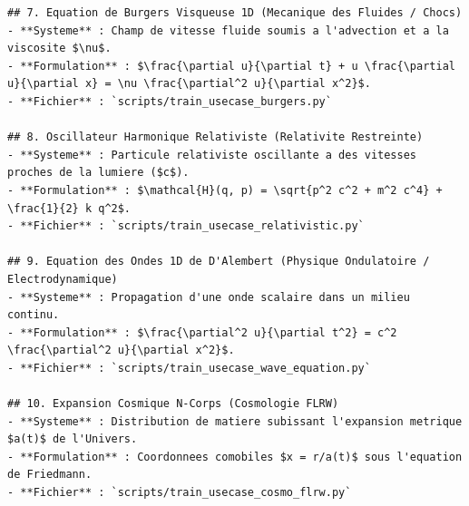 \documentclass[11pt,a4paper]{article}
\begin{document}
\begin{lstlisting}[language={}, caption={}, basicstyle=\ttfamily\footnotesize, breaklines=true]
## 7. Equation de Burgers Visqueuse 1D (Mecanique des Fluides / Chocs)
- **Systeme** : Champ de vitesse fluide soumis a l'advection et a la viscosite $\nu$.
- **Formulation** : $\frac{\partial u}{\partial t} + u \frac{\partial u}{\partial x} = \nu \frac{\partial^2 u}{\partial x^2}$.
- **Fichier** : `scripts/train_usecase_burgers.py`

## 8. Oscillateur Harmonique Relativiste (Relativite Restreinte)
- **Systeme** : Particule relativiste oscillante a des vitesses proches de la lumiere ($c$).
- **Formulation** : $\mathcal{H}(q, p) = \sqrt{p^2 c^2 + m^2 c^4} + \frac{1}{2} k q^2$.
- **Fichier** : `scripts/train_usecase_relativistic.py`

## 9. Equation des Ondes 1D de D'Alembert (Physique Ondulatoire / Electrodynamique)
- **Systeme** : Propagation d'une onde scalaire dans un milieu continu.
- **Formulation** : $\frac{\partial^2 u}{\partial t^2} = c^2 \frac{\partial^2 u}{\partial x^2}$.
- **Fichier** : `scripts/train_usecase_wave_equation.py`

## 10. Expansion Cosmique N-Corps (Cosmologie FLRW)
- **Systeme** : Distribution de matiere subissant l'expansion metrique $a(t)$ de l'Univers.
- **Formulation** : Coordonnees comobiles $x = r/a(t)$ sous l'equation de Friedmann.
- **Fichier** : `scripts/train_usecase_cosmo_flrw.py`

\end{lstlisting}
\end{document}
